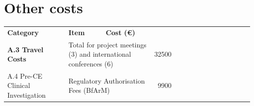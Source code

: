 \section{Other costs }
\begin{table}[]
\begin{tabular}{llllrrrrcrrrrrr}
\rowcolor[HTML]{B9CDE5} 
\textbf{Category}                                        & \textbf{Item}                                                 & \textbf{Cost (€)}                               & \textbf{}                                         & \multicolumn{1}{l}{\cellcolor[HTML]{B9CDE5}\textbf{}} & \multicolumn{1}{l}{\cellcolor[HTML]{B9CDE5}\textbf{}} & \multicolumn{1}{l}{\cellcolor[HTML]{B9CDE5}\textbf{}} & \multicolumn{1}{l}{\cellcolor[HTML]{B9CDE5}\textbf{}} & \multicolumn{1}{l}{\cellcolor[HTML]{B9CDE5}\textbf{}} & \multicolumn{1}{l}{\cellcolor[HTML]{C6D9F1}\textbf{}}          & \multicolumn{1}{l}{\cellcolor[HTML]{C6D9F1}\textbf{}}          & \multicolumn{1}{l}{\cellcolor[HTML]{C6D9F1}}          & \multicolumn{1}{l}{\cellcolor[HTML]{C6D9F1}}          & \multicolumn{1}{l}{\cellcolor[HTML]{92D050}\textbf{}}             & \multicolumn{1}{l}{\cellcolor[HTML]{92D050}\textbf{}}          \\
\rowcolor[HTML]{C6D9F1} 
\textbf{A.3 Travel Costs}                                & \multicolumn{2}{l}{\cellcolor[HTML]{C6D9F1}Total for project meetings (3) and international conferences (6)}    & \multicolumn{1}{r}{\cellcolor[HTML]{C6D9F1}32500} &                                                       & \multicolumn{1}{l}{\cellcolor[HTML]{C6D9F1}}          & \multicolumn{1}{c}{\cellcolor[HTML]{C6D9F1}}          & \multicolumn{1}{l}{\cellcolor[HTML]{C6D9F1}}          &                                                       & \multicolumn{1}{l}{\cellcolor[HTML]{C6D9F1}\textbf{}}          & \multicolumn{1}{c}{\cellcolor[HTML]{C6D9F1}}                   & \multicolumn{1}{l}{\cellcolor[HTML]{C6D9F1}}          & \multicolumn{1}{l}{\cellcolor[HTML]{C6D9F1}}          & \multicolumn{1}{l}{\cellcolor[HTML]{92D050}\textbf{}}             & \multicolumn{1}{l}{\cellcolor[HTML]{92D050}\textit{\textbf{}}} \\
A.4 Pre-CE Clinical Investigation                        & \multicolumn{2}{l}{\cellcolor[HTML]{FFFF99}Regulatory Authorisation Fees (BfArM)}                               & \multicolumn{1}{r}{\cellcolor[HTML]{FFFF99}9900}  & \cellcolor[HTML]{FFFF99}                              & \cellcolor[HTML]{FFFF99}                              & \cellcolor[HTML]{FFFF99}                              &                                                       & \cellcolor[HTML]{FFFF99}                              & \cellcolor[HTML]{92D050}\textbf{}                              & \cellcolor[HTML]{FFFF99}\textbf{}                              & \cellcolor[HTML]{92D050}                              & \cellcolor[HTML]{FFFF99}                              & \cellcolor[HTML]{BFBFBF}\textbf{}                                 & {\color[HTML]{FF0000} \textit{\textbf{}}}                      \\

\end{tabular}
\end{table}
